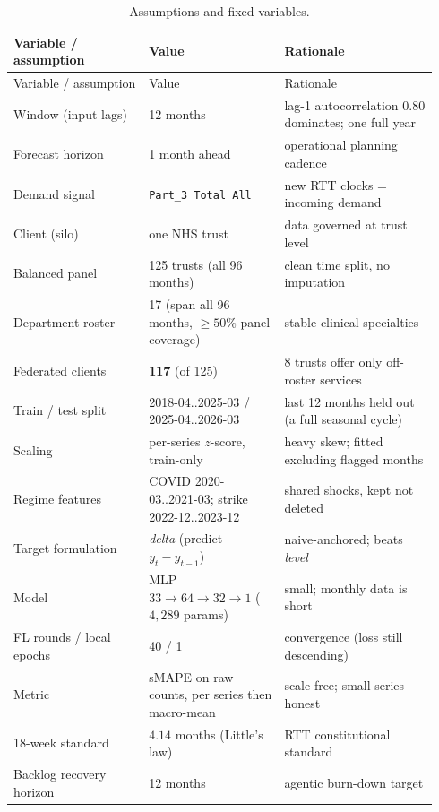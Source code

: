 \documentclass[11pt,a4paper]{article}
\begin{document}
\begin{longtable}{@{}p{0.30\linewidth} p{0.30\linewidth} p{0.34\linewidth}@{}}
\caption{Assumptions and fixed variables.}\label{tab:assump}\\
\toprule
Variable / assumption & Value & Rationale \\ \midrule \endfirsthead
\toprule Variable / assumption & Value & Rationale \\ \midrule \endhead \bottomrule \endfoot
Window (input lags) & 12 months & lag-1 autocorrelation $0.80$ dominates; one full year \\
Forecast horizon & 1 month ahead & operational planning cadence \\
Demand signal & \texttt{Part\_3 Total All} & new RTT clocks = incoming demand \\
Client (silo) & one NHS trust & data governed at trust level \\
Balanced panel & 125 trusts (all 96 months) & clean time split, no imputation \\
Department roster & 17 (span all 96 months, $\geq 50\%$ panel coverage) & stable clinical specialties \\
Federated clients & \textbf{117} (of 125) & 8 trusts offer only off-roster services \\
Train / test split & 2018-04..2025-03 / 2025-04..2026-03 & last 12 months held out (a full seasonal cycle) \\
Scaling & per-series $z$-score, train-only & heavy skew; fitted excluding flagged months \\
Regime features & COVID 2020-03..2021-03; strike 2022-12..2023-12 & shared shocks, kept not deleted \\
Target formulation & \emph{delta} (predict $y_t - y_{t-1}$) & naive-anchored; beats \emph{level} \\
Model & MLP $33\!\to\!64\!\to\!32\!\to\!1$ ($4{,}289$ params) & small; monthly data is short \\
FL rounds / local epochs & 40 / 1 & convergence (loss still descending) \\
Metric & sMAPE on raw counts, per series then macro-mean & scale-free; small-series honest \\
18-week standard & $4.14$ months (Little's law) & RTT constitutional standard \\
Backlog recovery horizon & 12 months & agentic burn-down target \\
\bottomrule
\end{longtable}
\end{document}

